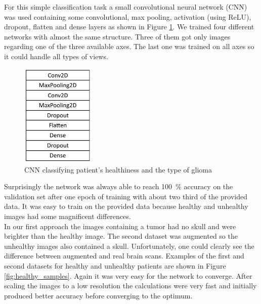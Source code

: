 \documentclass[a4paper,12pt,pagesize,headsepline,bibtotoc,titlepage]{scrartcl}
\begin{document}
For this simple classification task a small convolutional neural network (CNN) was used containing some convolutional, max pooling, activation (using ReLU), dropout, flatten and dense layers as shown in Figure \ref{fig:simple_cnn_model}.
We trained four different networks with almost the same structure.
Three of them got only images regarding one of the three available axes.
The last one was trained on all axes so it could handle all types of views. \\
\begin{figure}
\vspace*{-5mm}\hspace*{10mm}\includegraphics[width=35mm]{images/healthy_model.png}
\caption{CNN classifying patient's healthiness and the type of glioma}
\label{fig:simple_cnn_model}
\end{figure}
Surprisingly the network was always able to reach 100~\% accuracy on the validation set after one epoch of training with about two third of the provided data.
It was easy to train on the provided data because healthy and unhealthy images had some magnificent differences. \\
In our first approach the images containing a tumor had no skull and were brighter than the healthy image.
The second dataset was augmented so the unhealthy images also contained a skull.
Unfortunately, one could clearly see the difference between augmented and real brain scans.
Examples of the first and second datasets for healthy and unhealthy patients are shown in Figure \ref{fig:healthy_samples}.
Again it was very easy for the network to converge.
After scaling the images to a low resolution the calculations were very fast and initially produced better accuracy before converging to the optimum.
\end{document}
